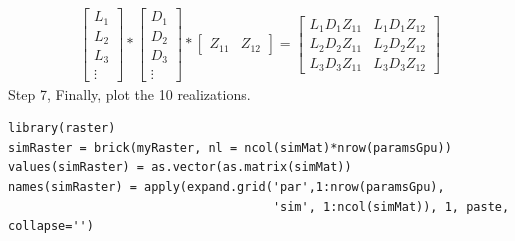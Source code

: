 \documentclass[article,nojss]{jss}\usepackage[]{graphicx}\usepackage[]{color}
\makeatletter
\newenvironment{kframe}{%
 \def\at@end@of@kframe{}%
 \ifinner\ifhmode%
  \def\at@end@of@kframe{\end{minipage}}%
  \begin{minipage}{\columnwidth}%
 \fi\fi%
 \def\FrameCommand##1{\hskip\@totalleftmargin \hskip-\fboxsep
 \colorbox{shadecolor}{##1}\hskip-\fboxsep
     \hskip-\linewidth \hskip-\@totalleftmargin \hskip\columnwidth}%
 \MakeFramed {\advance\hsize-\width
   \@totalleftmargin\z@ \linewidth\hsize
   \@setminipage}}%
 {\par\unskip\endMakeFramed%
 \at@end@of@kframe}
\newenvironment{knitrout}{}{} %
\makeatother
\begin{document}
\begin{gather}
 \begin{bmatrix}  L_{1} \\ L_{2} \\L_{3} \\ \vdots
 \end{bmatrix} 
 *
  \begin{bmatrix}
   D_{1} \\ D_{2} \\D_{3} \\ \vdots
   \end{bmatrix} 
   *
   \begin{bmatrix}
   Z_{11} & Z_{12}
   \end{bmatrix}
  =
 \begin{bmatrix}
   L_1D_1Z_{11} & L_1D_1Z_{12} \\
   L_2D_2Z_{11} & L_2D_2Z_{12} \\
   L_3D_3Z_{11} & L_3D_3Z_{12} 
  \end{bmatrix}
\end{gather}
Step 7, Finally, plot the 10 realizations.
\begin{knitrout}
\color{fgcolor}\begin{kframe}
\begin{verbatim}
library(raster)
simRaster = brick(myRaster, nl = ncol(simMat)*nrow(paramsGpu))
values(simRaster) = as.vector(as.matrix(simMat))
names(simRaster) = apply(expand.grid('par',1:nrow(paramsGpu), 
                                     'sim', 1:ncol(simMat)), 1, paste, collapse='')
\end{verbatim}
\end{kframe}
\end{knitrout}
\end{document}
